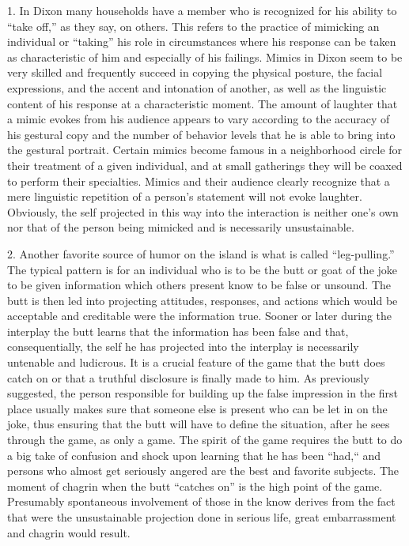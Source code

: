 \documentclass[openany,nobib]{tufte-book}
\begin{document}
1. In Dixon many households have a member who is recognized for his
ability to ``take off,'' as they say, on others. This refers to the
practice of mimicking an individual or ``taking'' his role in
circumstances where his response can be taken as characteristic of him
and especially of his failings. Mimics in Dixon seem to be very skilled
and frequently succeed in copying the physical posture, the facial
expressions, and the accent and intonation of another, as well as the
linguistic content of his response at a characteristic moment. The
amount of laughter that a mimic evokes from his audience appears to vary
according to the accuracy of his gestural copy and the number of
behavior levels that he is able to bring into the gestural portrait.
Certain mimics become famous in a neighborhood circle for their
treatment of a given individual, and at small gatherings they will be
coaxed to perform their specialties. Mimics and their audience clearly
recognize that a mere linguistic repetition of a person's statement will
not evoke laughter. Obviously, the self projected in this way into the
interaction is neither one's own nor that of the person being mimicked
and is necessarily unsustainable.

2. Another favorite source of humor on the island is what is called
``leg-pulling.'' The typical pattern is for an individual who is to be
the butt or goat of the joke to be given information which others
present know to be false or unsound. The butt is then led into
projecting attitudes, responses, and actions which would be acceptable
and creditable were the information true. Sooner or later during the
interplay the butt learns that the information has been false and that,
consequentially, the self he has projected into the interplay is
necessarily untenable and ludicrous. It is a crucial feature of the game
that the butt does catch on or that a truthful disclosure is finally
made to him. As previously suggested, the person responsible for
building up the false impression in the first place usually makes sure
that someone else is present who can be let in on the joke, thus
ensuring that the butt will have to define the situation, after he sees
through the game, as only a game. The spirit of the game requires the
butt to do a big take of confusion and shock upon learning that he has
been ``had,`` and persons who almost get seriously angered are the best
and favorite subjects. The moment of chagrin when the butt ``catches
on'' is the high point of the game. Presumably spontaneous involvement
of those in the know derives from the fact that were the unsustainable
projection done in serious life, great embarrassment and chagrin would
result.
\end{document}

